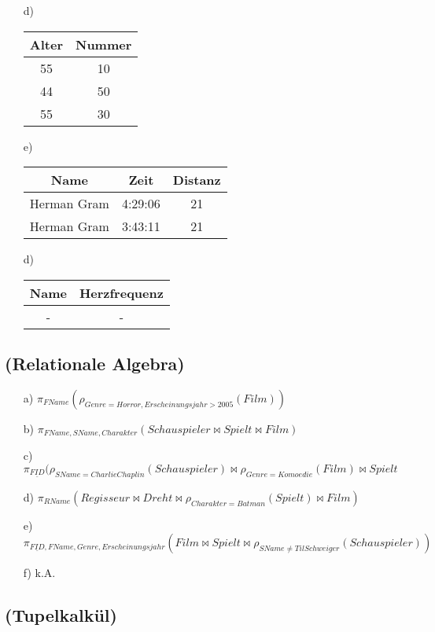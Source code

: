 \documentclass[11pt,a4paper]{article}
\begin{document}
\begin{enumerate}
\item[d)] \begin{tabular}{|c|c|}
\hline
Alter & Nummer\\
\hline\hline
55 & 10\\
\hline
44 & 50\\
\hline
55&30\\
\hline
\end{tabular}

\item[e)] \begin{tabular}{|c|c|c|}
\hline
Name & Zeit & Distanz\\
\hline\hline
Herman Gram & 4:29:06 & 21\\
\hline
Herman Gram & 3:43:11 & 21\\
\hline
\end{tabular}

\item[d)] \begin{tabular}{|c|c|}
\hline
Name & Herzfrequenz\\
\hline\hline
- & -\\
\hline

\end{tabular}
\end{enumerate}


\subsection{(Relationale Algebra)}
\begin{enumerate}
\item[a)] $\pi_{FName}(\rho_{Genre = Horror, Erscheinungsjahr > 2005}(Film))$
\item[b)] $\pi_{FName, SName, Charakter}(Schauspieler \Join Spielt \Join Film)$
\item[c)] $\pi_{\underline{FID}}(\rho_{SName = Charlie Chaplin}(Schauspieler) \Join \rho_{Genre = Komoedie}(Film) \Join Spielt$
\item[d)] $\pi_{RName}(Regisseur \Join Dreht \Join \rho_{Charakter = Batman}(Spielt) \Join Film)$
\item[e)] $\pi_{\underline{FID},FName,Genre, Erscheinungsjahr}( Film \Join Spielt \Join \rho_{SName \neq Til Schweiger}(Schauspieler))$
\item[f)] k.A.
\end{enumerate}

\subsection{(Tupelkalk\"ul)}
\end{document}
